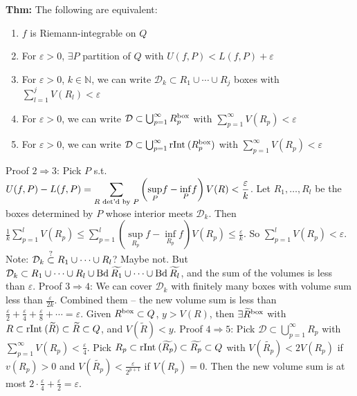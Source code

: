 \documentclass[10pt,letterpaper]{article}
\newcommand{\n}{\hfill\break}
\newcommand{\thm}[1]{\par\noindent\settowidth{\hangindent}{\textbf{Thm: }}\textbf{Thm: }#1\n}
\newcommand{\ptxt}[1]{\textrm{\textnormal{#1}}}
\newcommand{\naturals}{\mathbb{N}}
\newcommand{\N}{\naturals}
\renewcommand{\epsilon}{\varepsilon}
\newcommand{\Bd}{\ptxt{Bd}\>}
\newcommand{\rInt}{\ptxt{rInt}\>}
\newcommand{\st}{s.t.}
\begin{document}
\thm{The following are equivalent:
\begin{enumerate}
	\item $f$ is Riemann-integrable on $Q$
	\item For $\epsilon>0$, $\exists{}P$ partition of $Q$ with $U(f,P)<L(f,P)+\epsilon$
	\item For $\epsilon>0$, $k\in\N$, we can write $\mathcal{D}_{k}\subset{}R_{1}\cup\cdots\cup{}R_{j}$ boxes with $\sum_{l=1}^{j}V(R_{l})<\epsilon$
	\item For $\epsilon>0$, we can write $\mathcal{D}\subset\bigcup_{p=1}^{\infty}R_{p}^{\ptxt{box}}$ with $\sum_{p=1}^{\infty}V(R_{p})<\epsilon$
	\item For $\epsilon>0$, we can write $\mathcal{D}\subset\bigcup_{p=1}^{\infty}\rInt(R_{p}^{\ptxt{box}})$ with $\sum_{p=1}^{\infty}V(R_{p})<\epsilon$
\end{enumerate}
\n
Proof $2\Rightarrow{}3$: Pick $P$ \st{} $\displaystyle{}U(f,P)-L(f,P)=\sum_{R\ptxt{ det'd by }P}\left(\underset{P}{\sup}f-\underset{P}{\inf}f\right)V(R)<\frac{\epsilon}{k}$. Let $R_{1},\ldots,R_{l}$ be the boxes determined by $P$ whose interior meets $\mathcal{D}_{k}$.\n
Then $\displaystyle\frac{1}{k}\sum_{p=1}^{l}V(R_{p})\le\sum_{p=1}^{l}\left(\underset{R_{p}}{\sup}f-\underset{R_{p}}{\inf}f\right)V(R_{p})\le\frac{\epsilon}{k}$. So $\displaystyle\sum_{p=1}^{l}V(R_{p})<\epsilon$.\n
Note: $\mathcal{D}_{k}\overset{\ptxt{?}}{\subset}R_{1}\cup\cdots\cup{}R_{l}$? Maybe not. But $\mathcal{D}_{k}\subset{}R_{1}\cup\cdots\cup{}R_{l}\cup\Bd\widetilde{R_{1}}\cup\cdots\cup\Bd\widetilde{R_{l}}$, and the sum of the volumes is less than $\epsilon$.\n
\n
Proof $3\Rightarrow{}4$: We can cover $\mathcal{D}_{k}$ with finitely many boxes with volume sum less than $\frac{\epsilon}{2k}$. Combined them -- the new volume sum is less than $\frac{\epsilon}{2}+\frac{\epsilon}{4}+\frac{\epsilon}{8}+\cdots=\epsilon$. Given $R^{\ptxt{box}}\subset{}Q$, $y>V(R)$, then $\exists\widetilde{R}^{\ptxt{box}}$ with $R\subset\rInt(\widetilde{R})\subset\widetilde{R}\subset{}Q$, and $V(\widetilde{R})<y$.\n
\n
Proof $4\Rightarrow{}5$: Pick $\displaystyle\mathcal{D}\subset\bigcup_{p=1}^{\infty}R_{p}$ with $\displaystyle\sum_{p=1}^{\infty}V(R_{p})<\frac{\epsilon}{4}$. Pick $R_{p}\subset\rInt(\widetilde{R_{p}})\subset\widetilde{R_{p}}\subset{}Q$ with $V(\widetilde{R_{p}})<2V(R_{p})$ if $v(R_{p})>0$ and $V(\widetilde{R_{p}})<\frac{\epsilon}{2^{p+1}}$ if $V(R_{p})=0$. Then the new volume sum is at most $2\cdot\frac{\epsilon}{4}+\frac{\epsilon}{2}=\epsilon$.}
\end{document}
